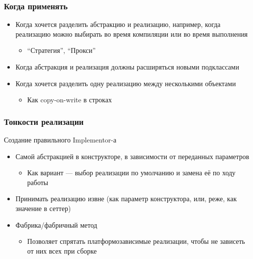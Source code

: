 \documentclass{../../slides-style}
\begin{document}
    \begin{frame}
        \frametitle{Когда применять}
        \begin{itemize}
            \item Когда хочется разделить абстракцию и реализацию, например, когда реализацию можно выбирать во время компиляции или во время выполнения
            \begin{itemize}
                \item ``Стратегия'', ``Прокси''
            \end{itemize}
            \item Когда абстракция и реализация должны расширяться новыми подклассами
            \item Когда хочется разделить одну реализацию между несколькими объектами
            \begin{itemize}
                \item Как copy-on-write в строках
            \end{itemize}
        \end{itemize}
    \end{frame}

    \begin{frame}
        \frametitle{Тонкости реализации}
        Создание правильного Implementor-а
        \begin{itemize}
            \item Самой абстракцией в конструкторе, в зависимости от переданных параметров
            \begin{itemize}
                \item Как вариант --- выбор реализации по умолчанию и замена её по ходу работы
            \end{itemize}
            \item Принимать реализацию извне (как параметр конструктора, или, реже, как значение в сеттер)
            \item Фабрика/фабричный метод
            \begin{itemize}
                \item Позволяет спрятать платформозависимые реализации, чтобы не зависеть от них всех при сборке
            \end{itemize}
        \end{itemize}
    \end{frame}
\end{document}
